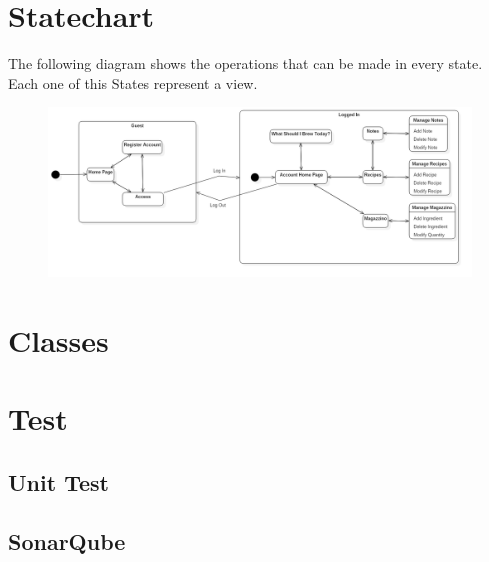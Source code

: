 \documentclass[12pt]{article}
\begin{document}
\pagebreak
\section{Statechart}
The following diagram shows the operations that can be made in every state.\\
Each one of this States represent a view.
\begin{figure}[H]
\includegraphics[scale=0.4]{Statechart.png}
\end{figure}
\section{Classes}
\section{Test}
\subsection{Unit Test}
\subsection{SonarQube}
\end{document}
